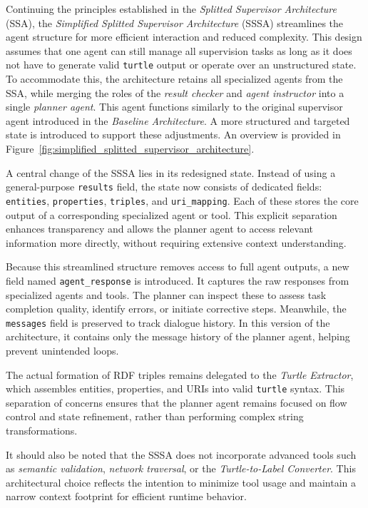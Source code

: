 \documentclass[a4paper,oneside,bibliography=totoc]{scrbook}
\begin{document}
Continuing the principles established in the \textit{Splitted Supervisor Architecture} (\ac{SSA}), the \textit{Simplified Splitted Supervisor Architecture} (\ac{SSSA}) streamlines the agent structure for more efficient interaction and reduced complexity. This design assumes that one agent can still manage all supervision tasks as long as it does not have to generate valid \texttt{turtle} output or operate over an unstructured state. To accommodate this, the architecture retains all specialized agents from the \ac{SSA}, while merging the roles of the \textit{result checker} and \textit{agent instructor} into a single \textit{planner agent}. This agent functions similarly to the original supervisor agent introduced in the \textit{Baseline Architecture}. A more structured and targeted state is introduced to support these adjustments. An overview is provided in Figure~\ref{fig:simplified_splitted_supervisor_architecture}.

A central change of the \ac{SSSA} lies in its redesigned state. Instead of using a general-purpose \texttt{results} field, the state now consists of dedicated fields: \texttt{entities}, \texttt{properties}, \texttt{triples}, and \texttt{uri\_mapping}. Each of these stores the core output of a corresponding specialized agent or tool. This explicit separation enhances transparency and allows the planner agent to access relevant information more directly, without requiring extensive context understanding.

Because this streamlined structure removes access to full agent outputs, a new field named \texttt{agent\_response} is introduced. It captures the raw responses from specialized agents and tools. The planner can inspect these to assess task completion quality, identify errors, or initiate corrective steps. Meanwhile, the \texttt{messages} field is preserved to track dialogue history. In this version of the architecture, it contains only the message history of the planner agent, helping prevent unintended loops.

The actual formation of RDF triples remains delegated to the \textit{Turtle Extractor}, which assembles entities, properties, and URIs into valid \texttt{turtle} syntax. This separation of concerns ensures that the planner agent remains focused on flow control and state refinement, rather than performing complex string transformations.

It should also be noted that the \ac{SSSA} does not incorporate advanced tools such as \textit{semantic validation}, \textit{network traversal}, or the \textit{Turtle-to-Label Converter}. This architectural choice reflects the intention to minimize tool usage and maintain a narrow context footprint for efficient runtime behavior.
\end{document}
